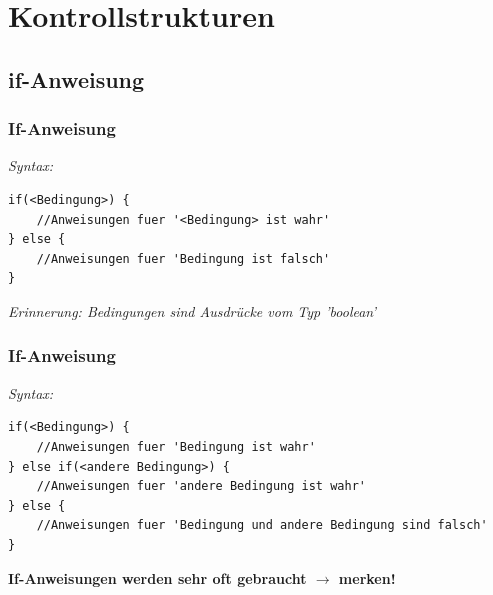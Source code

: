 \documentclass[18pt]{beamer}
\begin{document}

\section{Kontrollstrukturen}
\subsection{if-Anweisung}
\begin{frame}[containsverbatim]
	\frametitle{If-Anweisung}
	
		\emph{Syntax:}
		\begin{lstlisting}
if(<Bedingung>) {
	//Anweisungen fuer '<Bedingung> ist wahr'
} else {
	//Anweisungen fuer 'Bedingung ist falsch'
}
		\end{lstlisting}
		\emph{Erinnerung: Bedingungen sind Ausdrücke vom Typ 'boolean'}
\end{frame}


\begin{frame}[containsverbatim]
	\frametitle{If-Anweisung}
	
		\emph{Syntax:}
		\begin{lstlisting}
if(<Bedingung>) {
	//Anweisungen fuer 'Bedingung ist wahr'
} else if(<andere Bedingung>) {
	//Anweisungen fuer 'andere Bedingung ist wahr'
} else {
	//Anweisungen fuer 'Bedingung und andere Bedingung sind falsch'
}
		\end{lstlisting}
		\textbf{If-Anweisungen werden sehr oft gebraucht $\rightarrow$ merken!}
\end{frame}


\end{document}
